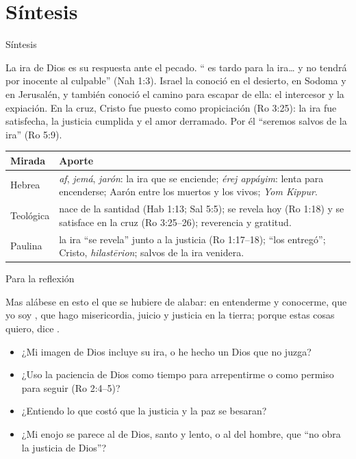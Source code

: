 \section{Síntesis}

\begin{frame}{Síntesis}
\begin{tcolorbox}[colback=papiro,colframe=azul,boxrule=1pt,arc=3pt]
\small La ira de Dios es su respuesta  ante el pecado. ``\SENOR{} es tardo para la ira\ldots{} y no tendrá por inocente al culpable'' (Nah 1:3). Israel la conoció en el desierto, en Sodoma y en Jerusalén, y también conoció el camino para escapar de ella: el intercesor y la expiación. En la cruz, Cristo fue puesto como propiciación (Ro 3:25): la ira fue satisfecha, la justicia cumplida y el amor derramado. Por él ``seremos salvos de la ira'' (Ro 5:9).
\end{tcolorbox}
\scriptsize\renewcommand{\arraystretch}{1.2}
\begin{tabular}{@{}>{\RaggedRight\arraybackslash}p{2.4cm}>{\RaggedRight\arraybackslash}p{9.4cm}@{}}
\toprule
\textbf{Mirada} & \textbf{Aporte} \\ \midrule
Hebrea & \emph{af}, \emph{jemá}, \emph{jarón}: la ira que se enciende; \emph{érej appáyim}: lenta para encenderse; Aarón entre los muertos y los vivos; \emph{Yom Kippur}. \\
Teológica & nace de la santidad (Hab 1:13; Sal 5:5); se revela hoy (Ro 1:18) y se satisface en la cruz (Ro 3:25--26); reverencia y gratitud. \\
Paulina & la ira ``se revela'' junto a la justicia (Ro 1:17--18); ``los entregó''; Cristo, \emph{hilastērion}; salvos de la ira venidera. \\
\bottomrule
\end{tabular}
\end{frame}

\begin{frame}{Para la reflexión}
\begin{cita}Mas alábese en esto el que se hubiere de alabar: en entenderme y conocerme, que yo soy \SENOR, que hago misericordia, juicio y justicia en la tierra; porque estas cosas quiero, dice \SENOR.\end{cita}
\small
\begin{itemize}
\item ¿Mi imagen de Dios incluye su ira, o he hecho un Dios que no juzga?
\item ¿Uso la paciencia de Dios como tiempo para arrepentirme o como permiso para seguir (Ro 2:4--5)?
\item ¿Entiendo lo que costó que la justicia y la paz se besaran?
\item ¿Mi enojo se parece al de Dios, santo y lento, o al del hombre, que ``no obra la justicia de Dios''?
\end{itemize}
\end{frame}

